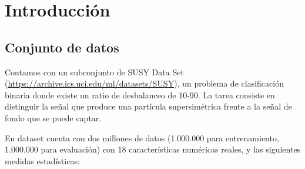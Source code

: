 \section{Introducción}

\subsection{Conjunto de datos}


Contamos con un subconjunto de SUSY Data Set (\url{https://archive.ics.uci.edu/ml/datasets/SUSY}), un problema de clasificación binaria donde existe un ratio de desbalanceo de 10-90. La tarea consiste en distinguir la señal que produce una partícula supersimétrica frente a la señal de fondo que se puede captar.

En dataset cuenta con dos millones de datos (1.000.000 para entrenamiento, 1.000.000 para evaluación) con 18 características numéricas reales, y las siguientes medidas estadísticas:

